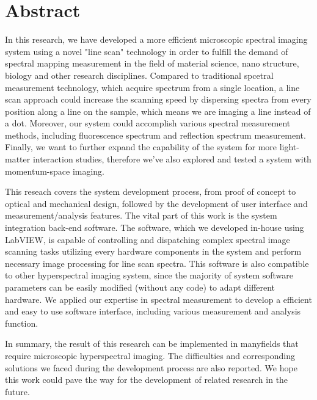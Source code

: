 \documentclass[12pt]{article}
\begin{document}
\section*{Abstract}
In this research, we have developed a more efficient microscopic spectral imaging system using a novel "line scan" technology in order to fulfill the demand of spectral mapping measurement in the field of material science, nano structure, biology and other research disciplines. Compared to traditional spcetral measurement technology, which acquire spectrum from a single location, a line scan approach could increase the scanning speed by dispersing spectra from every position along a line on the sample, which means we are imaging a line instead of a dot. Moreover, our system could accomplish various spectral measurement methods, including fluorescence spectrum and reflection spectrum measurement. Finally, we want to further expand the capability of the system for more light-matter interaction studies, therefore we've also explored and tested a system with momentum-space imaging.

This reseach covers the system development process, from proof of concept to optical and mechanical design, followed by the development of user interface and measurement/analysis features. The vital part of this work is the system integration back-end software. The software, which we developed in-house  using LabVIEW, is capable of controlling and dispatching complex spectral image scanning tasks utilizing every hardware components in the system and perform necessary image processing for line scan spectra. This software is also compatible to other hyperspectral imaging system, since the majority of system software parameters can be easily modified (without any code) to adapt different hardware. We applied our expertise in spectral measurement to develop a efficient and easy to use software interface, including various measurement and analysis function.

In summary, the result of this research can be implemented in manyfields that require microscopic hyperspectral imaging. The difficulties and corresponding solutions we faced during the development process are also reported. We hope this work could  pave the way for the development of related research in the future.

\noindent \textbf{}
\newpage
\tableofcontents
\listoffigures
\listoftables
\newpage
{}
\end{document}
